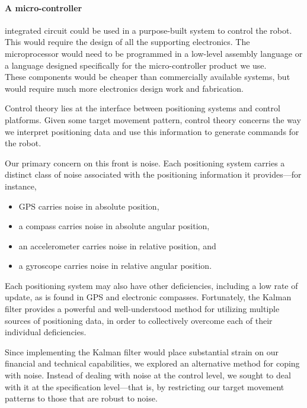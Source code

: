         \paragraph{A micro-controller} integrated circuit could be used in a purpose-built system to control the robot. This would require the design of all the supporting electronics. The microprocessor would need to be programmed in a low-level assembly language or a language designed specifically for the micro-controller product we use.\\
        These components would be cheaper than commercially available systems, but would require much more electronics design work and fabrication.


    \label{outline: control theory}
        Control theory lies at the interface between positioning systems and control platforms.
        Given some target movement pattern, control theory concerns the way we interpret positioning data and use this information to generate commands for the robot.

        Our primary concern on this front is noise.
        Each positioning system carries a distinct class of noise associated with the positioning information it provides---for instance,
        \begin{itemize}
            \item GPS carries noise in absolute position,
            \item a compass carries noise in absolute angular position,
            \item an accelerometer carries noise in relative position, and
            \item a gyroscope carries noise in relative angular position.
        \end{itemize}
        Each positioning system may also have other deficiencies, including a low rate of update, as is found in GPS and electronic compasses.
        Fortunately, the Kalman filter provides a powerful and well-understood method for utilizing multiple sources of positioning data, in order to collectively overcome each of their individual deficiencies.

        Since implementing the Kalman filter would place substantial strain on our financial and technical capabilities, we explored an alternative method for coping with noise.
        Instead of dealing with noise at the control level, we sought to deal with it at the specification level---that is, by restricting our target movement patterns to those that are robust to noise.

